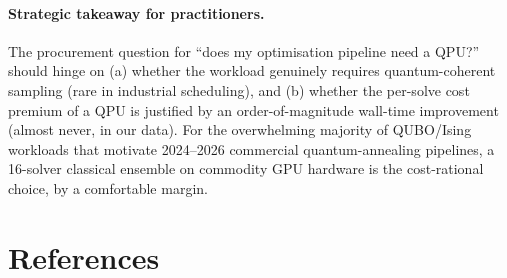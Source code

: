 \documentclass[11pt,a4paper]{article}
\begin{document}
\paragraph{Strategic takeaway for practitioners.}
The procurement question for ``does my optimisation pipeline need a
QPU?'' should hinge on (a) whether the workload genuinely requires
quantum-coherent sampling (rare in industrial scheduling), and (b)
whether the per-solve cost premium of a QPU is justified by an
order-of-magnitude wall-time improvement (almost never, in our data).
For the overwhelming majority of QUBO/Ising workloads that motivate
2024--2026 commercial quantum-annealing pipelines, a 16-solver
classical ensemble on commodity GPU hardware is the cost-rational
choice, by a comfortable margin.

\section*{References}

\renewcommand{\refname}{}
\end{document}
